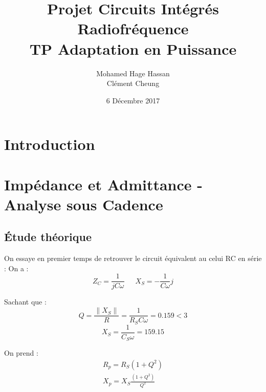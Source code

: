 \documentclass[a4paper]{article}
\begin{document}
\newcommand\textstyleEmphasis[1]{\textit{#1}}
\renewcommand{\contentsname}{Table des mati\`eres}
\renewcommand\refname{R\'ef\'erences}

\renewcommand{\abstractname}{Pr\'eambule}
\title{\textbf{Projet Circuits Int\'egr\'es Radiofr\'equence \\ TP Adaptation en Puissance}}
\author{Mohamed Hage Hassan \\ Cl\'ement Cheung}
\date{6 D\'ecembre 2017}
\maketitle
\thispagestyle{empty}

\tableofcontents
\clearpage

\section*{Introduction}

\section{Imp\'edance et Admittance - Analyse sous Cadence}
\subsection{\'Etude th\'eorique}

On essaye en premier temps de retrouver le circuit \'equivalent au celui RC en s\'erie :
On a :
\begin{equation}
  Z_C = \frac{1}{jC\omega} \phantom{8} \phantom{8} \phantom{8} X_S = - \frac{1}{C\omega}j
\end{equation}

Sachant que :
\[
Q = \frac{\|X_S \|}{R} = \frac{1}{R_S C\omega} = 0.159 < 3
\]
\[
X_S = \frac{1}{C_S \omega} = 159.15
\]

On prend :
\begin{equation}
  \begin{split}
  R_p = R_S (1 + Q^2) \\
  X_p = X_S \frac{(1+Q^2)}{Q^2}
  \end{split}
\end{equation}
\end{document}
